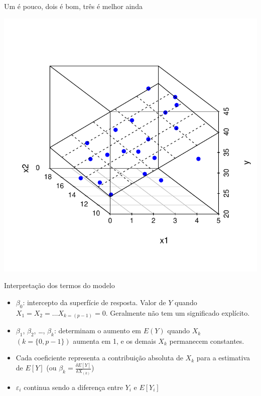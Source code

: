 \documentclass{beamer}\usepackage[]{graphicx}\usepackage[]{color}
\newenvironment{knitrout}{}{} %
\renewenvironment{knitrout}{\setlength{\topsep}{0mm}}{}
\begin{document}
\begin{frame}{Um é pouco, dois é bom, três é melhor ainda}

\begin{knitrout}
\color{fgcolor}
\includegraphics[width=0.6\linewidth]{figure/c1-1} 

\end{knitrout}

\end{frame}


\begin{frame}{Interpretação dos termos do modelo}

\begin{itemize}

\item $\beta _0$: intercepto da superfície de resposta. Valor de $Y$ quando  $X_{1} = X_2 = \dots X_{k=(p-1)} = 0$. Geralmente não tem um significado explícito. \pause
\vfill
\item $\beta _1$, $\beta _2$, \ldots, $\beta _k$: determinam o aumento em $E(Y)$ quando $X_{k}$ $(k=\{0,p-1\})$ aumenta em 1, e os demais $X_k$ permanecem constantes.\pause
\vfill
\item Cada coeficiente representa a contribuição absoluta de  $X_{k}$ para a estimativa de $E[Y]$ (ou $\beta _k = \frac{\delta E[Y]}{\delta X_{(k)}}$) \pause
\vfill
\item $\varepsilon _i$ continua sendo a diferença entre $Y_i$ e $E[Y_i]$

\end{itemize}

\end{frame}
\end{document}
